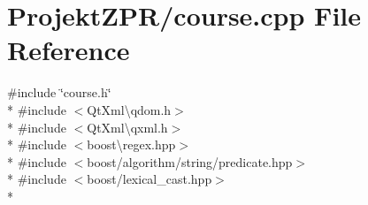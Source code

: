 \section{Projekt\-Z\-P\-R/course.cpp File Reference}
\label{course_8cpp}
{\ttfamily \#include \char`\"{}course.\-h\char`\"{}}\\*
{\ttfamily \#include $<$Qt\-Xml\textbackslash{}qdom.\-h$>$}\\*
{\ttfamily \#include $<$Qt\-Xml\textbackslash{}qxml.\-h$>$}\\*
{\ttfamily \#include $<$boost\textbackslash{}regex.\-hpp$>$}\\*
{\ttfamily \#include $<$boost/algorithm/string/predicate.\-hpp$>$}\\*
{\ttfamily \#include $<$boost/lexical\-\_\-cast.\-hpp$>$}\\*
